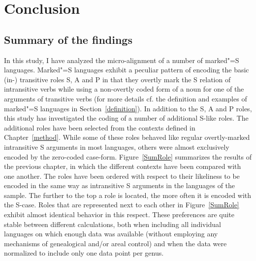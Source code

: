 \chapter{Conclusion}\label{conclusion}


\section{Summary of the findings}

In this study, I have analyzed the micro-alignment of a number of marked"=S languages.
Marked"=S languages exhibit a peculiar pattern of encoding the basic (in-) transitive roles S, A and P in that they overtly mark the S relation of intransitive verbs while using a non-overtly coded form of a noun for one of the arguments of transitive verbs (for more details cf. the definition and examples of marked"=S languages in Section~\ref{definition}). 
In addition to the S, A and P roles, this study has investigated the coding of a number of additional S-like roles.
The additional roles have been selected from the contexts defined in Chapter~\ref{method}.
While some of these roles behaved like regular overtly-marked intransitive S arguments in most languages, others were almost exclusively encoded by the zero-coded case-form. 
Figure~\ref{SumRole} summarizes  the results of the previous chapter, in which the different contexts have been compared with one another.
The roles have been ordered with respect to their likeliness to be encoded in the same way as intransitive S arguments in the languages of the sample. 
The further to the top a role is located, the more often it is encoded with the S-case.
Roles that are represented next to each other in Figure~\ref{SumRole} exhibit almost identical behavior in this respect.
These preferences are quite stable between different calculations, both when including all individual languages on which enough data was available (without employing any mechanisms of genealogical and/or areal control) and when the data were normalized to include only one data point per genus.


